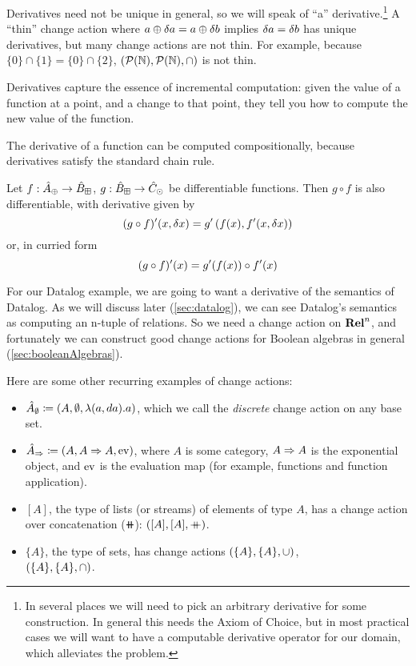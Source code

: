 Derivatives need not be unique in general, so we will speak of ``a''
derivative.\footnote{In several places we will need to pick an arbitrary
  derivative for some construction. In general this needs the Axiom of Choice,
  but in most practical cases we will want to have a computable derivative
  operator for our domain, which alleviates the problem.} A ``thin'' change
action \textemdash where $a \oplus \delta a = a \oplus \delta b$ implies $\delta a =
\delta b$ \textemdash has unique derivatives, but many change actions are not thin.
For example, because $\{0\} \cap \{1\} = \{0\}
\cap \{2\}$, $(\mathcal{P}(\mathbb{N}),\mathcal{P}(\mathbb{N}),\cap)$ is not thin.

Derivatives capture the essence of incremental computation: given the value of a
function at a point, and a change to that point, they tell you how to compute
the new value of the function.

The derivative of a function can be computed compositionally, because derivatives satisfy the standard chain rule.

\begin{thm}
  Let $f: \hat{A}_\oplus \rightarrow \hat{B}_\boxplus$, $g: \hat{B}_\boxplus \rightarrow \hat{C}_\odot$ be differentiable functions. Then $g \circ f$ is also
  differentiable, with derivative given by
  \begin{displaymath}
    (g \circ f)'(x, \delta x) = g'\left(f(x), f'(x, \delta x)\right)
  \end{displaymath}
  or, in curried form
  \begin{displaymath}
    (g \circ f)'(x) = g'(f(x)) \circ f'(x)
  \end{displaymath}
\end{thm}

For our Datalog example, we are going to want a derivative of the semantics of
Datalog. As we will discuss later (\cref{sec:datalog}), we can see Datalog's
semantics as computing an n-tuple of relations. So we need a change action on
$\mathbf{Rel}^n$, and fortunately we can construct good change actions for Boolean
algebras in general (\cref{sec:booleanAlgebras}).

Here are some other recurring examples of change actions:
\begin{itemize}
  \item $\hat{A}_\emptyset \coloneqq (A,\emptyset,\lambda(a, da). a)$,
    which we call the \emph{discrete} change action on any base set.
  \item $\hat{A}_\Rightarrow \coloneqq (A,{A} \Rightarrow {A},\operatorname{ev})$, where $A$ is some
    category, ${A} \Rightarrow {A}$ is the exponential object, and $\operatorname{ev}$ is the evaluation map
    (for example, functions and function application).
  \item $[A]$, the type of lists (or streams) of elements of type $A$, has a
    change action over concatenation ($\doubleplus$): $([A],[A],\mathbin{+\mkern-10mu+})$.
  \item $\{A\}$, the type of sets, has change actions $(\{A\},\{A\},\cup)$,\\ $(\{A\},\{A\},\cap)$.
\end{itemize}

